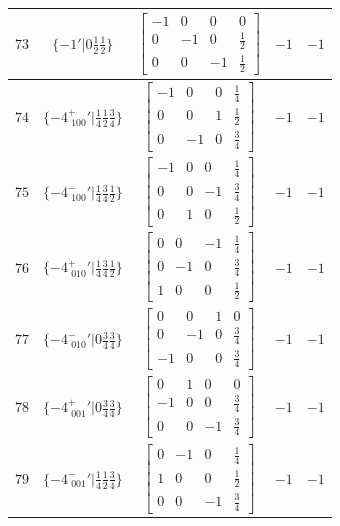 \documentclass[fleqn,8pt]{jsarticle}
\begin{document}
\begin{longtable}{ccccc}
$ 73 $ & $ \{-1{}'|0 \frac{1}{2} \frac{1}{2}\} $ & $ \begin{bmatrix} -1 & 0 & 0 & 0 \\ 0 & -1 & 0 & \frac{1}{2} \\ 0 & 0 & -1 & \frac{1}{2} \end{bmatrix} $ & $ -1 $ & $ -1 $ \\ \hline
$ 74 $ & $ \{-4^{+}_{\,\,100}{}'|\frac{1}{4} \frac{1}{2} \frac{3}{4}\} $ & $ \begin{bmatrix} -1 & 0 & 0 & \frac{1}{4} \\ 0 & 0 & 1 & \frac{1}{2} \\ 0 & -1 & 0 & \frac{3}{4} \end{bmatrix} $ & $ -1 $ & $ -1 $ \\ \hline
$ 75 $ & $ \{-4^{-}_{\,\,100}{}'|\frac{1}{4} \frac{3}{4} \frac{1}{2}\} $ & $ \begin{bmatrix} -1 & 0 & 0 & \frac{1}{4} \\ 0 & 0 & -1 & \frac{3}{4} \\ 0 & 1 & 0 & \frac{1}{2} \end{bmatrix} $ & $ -1 $ & $ -1 $ \\ \hline
$ 76 $ & $ \{-4^{+}_{\,\,010}{}'|\frac{1}{4} \frac{3}{4} \frac{1}{2}\} $ & $ \begin{bmatrix} 0 & 0 & -1 & \frac{1}{4} \\ 0 & -1 & 0 & \frac{3}{4} \\ 1 & 0 & 0 & \frac{1}{2} \end{bmatrix} $ & $ -1 $ & $ -1 $ \\ \hline
$ 77 $ & $ \{-4^{-}_{\,\,010}{}'|0 \frac{3}{4} \frac{3}{4}\} $ & $ \begin{bmatrix} 0 & 0 & 1 & 0 \\ 0 & -1 & 0 & \frac{3}{4} \\ -1 & 0 & 0 & \frac{3}{4} \end{bmatrix} $ & $ -1 $ & $ -1 $ \\ \hline
$ 78 $ & $ \{-4^{+}_{\,\,001}{}'|0 \frac{3}{4} \frac{3}{4}\} $ & $ \begin{bmatrix} 0 & 1 & 0 & 0 \\ -1 & 0 & 0 & \frac{3}{4} \\ 0 & 0 & -1 & \frac{3}{4} \end{bmatrix} $ & $ -1 $ & $ -1 $ \\ \hline
$ 79 $ & $ \{-4^{-}_{\,\,001}{}'|\frac{1}{4} \frac{1}{2} \frac{3}{4}\} $ & $ \begin{bmatrix} 0 & -1 & 0 & \frac{1}{4} \\ 1 & 0 & 0 & \frac{1}{2} \\ 0 & 0 & -1 & \frac{3}{4} \end{bmatrix} $ & $ -1 $ & $ -1 $ \\ \hline

\end{longtable}
\end{document}
